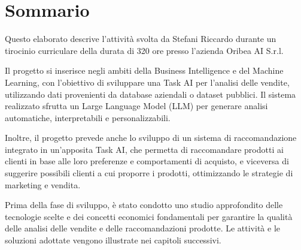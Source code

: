 \cleardoublepage
{}
{}
\begingroup
\let\clearpage\relax
\let\cleardoublepage\relax
\let\cleardoublepage\relax

\chapter*{Sommario}

Questo elaborato descrive l’attività svolta da Stefani Riccardo durante un tirocinio curriculare della durata di 320 ore presso l’azienda Oribea AI S.r.l.

Il progetto si inserisce negli ambiti della Business Intelligence e del Machine Learning, con l'obiettivo di sviluppare una Task AI per l'analisi delle vendite, utilizzando dati provenienti da database aziendali o dataset pubblici. Il sistema realizzato sfrutta un Large Language Model (LLM) per generare analisi automatiche, interpretabili e personalizzabili.

Inoltre, il progetto prevede anche lo sviluppo di un sistema di raccomandazione integrato in un'apposita Task AI, che permetta di raccomandare prodotti ai clienti in base alle loro preferenze e comportamenti di acquisto, e viceversa di suggerire possibili clienti a cui proporre i prodotti, ottimizzando le strategie di marketing e vendita.

Prima della fase di sviluppo, è stato condotto uno studio approfondito delle tecnologie scelte e dei concetti economici fondamentali per garantire la qualità delle analisi delle vendite e delle raccomandazioni prodotte. Le attività e le soluzioni adottate vengono illustrate nei capitoli successivi.




\endgroup

\vfill
